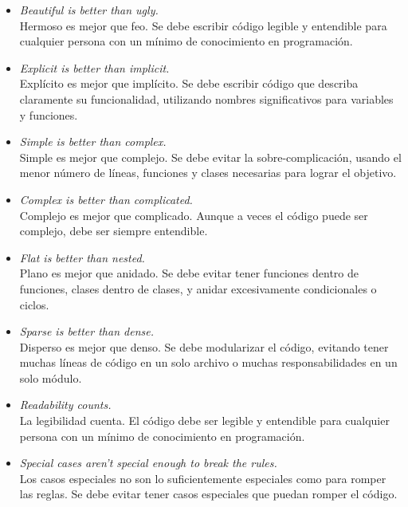 \documentclass[executivepaper]{article}
\begin{document}
\begin{itemize}
    \item \emph{Beautiful is better than ugly.} \\
    Hermoso es mejor que feo. Se debe escribir código legible y entendible para cualquier persona con un mínimo de conocimiento en programación.
    
    \item \emph{Explicit is better than implicit.} \\
    Explícito es mejor que implícito. Se debe escribir código que describa claramente su funcionalidad, utilizando nombres significativos para variables y funciones.
    
    \item \emph{Simple is better than complex.} \\
    Simple es mejor que complejo. Se debe evitar la sobre-complicación, usando el menor número de líneas, funciones y clases necesarias para lograr el objetivo.
    
    \item \emph{Complex is better than complicated.} \\
    Complejo es mejor que complicado. Aunque a veces el código puede ser complejo, debe ser siempre entendible.
    
    \item \emph{Flat is better than nested.} \\
    Plano es mejor que anidado. Se debe evitar tener funciones dentro de funciones, clases dentro de clases, y anidar excesivamente condicionales o ciclos.
    
    \item \emph{Sparse is better than dense.} \\
    Disperso es mejor que denso. Se debe modularizar el código, evitando tener muchas líneas de código en un solo archivo o muchas responsabilidades en un solo módulo.
    
    \item \emph{Readability counts.} \\
    La legibilidad cuenta. El código debe ser legible y entendible para cualquier persona con un mínimo de conocimiento en programación.
    
    \item \emph{Special cases aren't special enough to break the rules.} \\
    Los casos especiales no son lo suficientemente especiales como para romper las reglas. Se debe evitar tener casos especiales que puedan romper el código.
    

\end{itemize}
\end{document}
